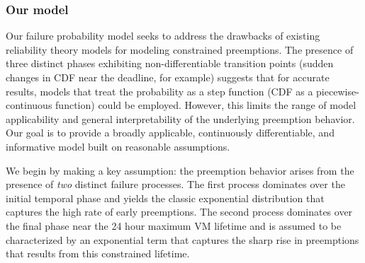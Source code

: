 \subsubsection{Our  model}
\label{subsec:preemption-model}



Our failure probability model seeks to address the drawbacks of existing reliability theory models for modeling constrained preemptions. 
The presence of three distinct phases exhibiting non-differentiable transition points (sudden changes in CDF near the deadline, for example) suggests that for accurate results, models that treat the probability as a step function (CDF as a piecewise-continuous function) could be employed.
However, this limits the range of model applicability and general interpretability of the underlying preemption behavior. Our goal is to provide a broadly applicable, continuously differentiable, and informative model built on reasonable assumptions.  


We begin by making a key assumption: the preemption behavior arises from the presence of \emph{two} distinct failure processes.
The first process dominates over the initial temporal phase and yields the classic exponential distribution that captures the high rate of early preemptions.
The second process dominates over the final phase near the 24 hour maximum VM lifetime and is assumed to be characterized by an exponential term that captures the sharp rise in preemptions that results from this constrained lifetime. 

%
%

